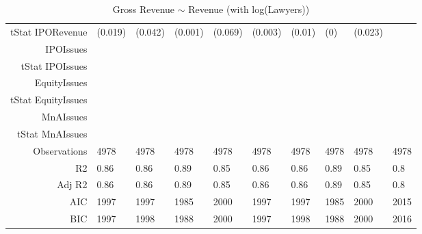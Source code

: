 \begin{table}[ht]
\begin{tabular}{rlllllllll}
  tStat IPORevenue & (0.019) & (0.042) & (0.001) & (0.069) & (0.003) & (0.01) & (0) & (0.023) &  \\ 
  IPOIssues &  &  &  &  &  &  &  &  &  \\ 
  tStat IPOIssues &  &  &  &  &  &  &  &  &  \\ 
  EquityIssues &  &  &  &  &  &  &  &  &  \\ 
  tStat EquityIssues &  &  &  &  &  &  &  &  &  \\ 
  MnAIssues &  &  &  &  &  &  &  &  &  \\ 
  tStat MnAIssues &  &  &  &  &  &  &  &  &  \\ 
  Observations & 4978 & 4978 & 4978 & 4978 & 4978 & 4978 & 4978 & 4978 & 4978 \\ 
  R2 & 0.86 & 0.86 & 0.89 & 0.85 & 0.86 & 0.86 & 0.89 & 0.85 & 0.8 \\ 
  Adj R2 & 0.86 & 0.86 & 0.89 & 0.85 & 0.86 & 0.86 & 0.89 & 0.85 & 0.8 \\ 
  AIC & 1997 & 1997 & 1985 & 2000 & 1997 & 1997 & 1985 & 2000 & 2015 \\ 
  BIC & 1997 & 1998 & 1988 & 2000 & 1997 & 1998 & 1988 & 2000 & 2016 \\ 
   \hline
\end{tabular}
\caption{Gross Revenue $\sim$ Revenue (with log(Lawyers))} 
\end{table}
